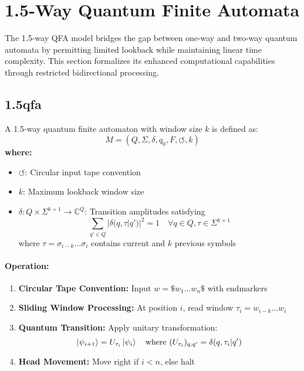 \section{1.5-Way Quantum Finite Automata}
\label{sec:1.5qfa}

The 1.5-way QFA model bridges the gap between one-way and two-way quantum automata by permitting limited lookback while maintaining linear time complexity. This section formalizes its enhanced computational capabilities through restricted bidirectional processing.

\subsection{\acrfull{1.5qfa}}
\label{subsec:1.5qfa}

\begin{definition}
A 1.5-way quantum finite automaton with window size $k$ is defined as:
\[
M = (Q, \Sigma, \delta, q_0, F, \circlearrowleft, k)
\]
\textbf{where:}
\begin{itemize}
    \item $\circlearrowleft$: Circular input tape convention
    \item $k$: Maximum lookback window size
    \item $\delta: Q \times \Sigma^{k+1} \rightarrow \mathbb{C}^Q$: Transition amplitudes satisfying
    \[
    \sum_{q'\in Q} |\delta(q,\tau|q')|^2 = 1 \quad \forall q \in Q, \tau \in \Sigma^{k+1}
    \]
    where $\tau = \sigma_{i-k}...\sigma_i$ contains current and $k$ previous symbols
\end{itemize}
\end{definition}

\paragraph{Operation:}
\begin{enumerate}
    \item \textbf{Circular Tape Convention:} Input $w = \$w_1...w_n\$$ with endmarkers
    \item \textbf{Sliding Window Processing:} At position $i$, read window $\tau_i = w_{i-k}...w_i$
    \item \textbf{Quantum Transition:} Apply unitary transformation:
    \[
    \ket{\psi_{i+1}} = U_{\tau_i} \ket{\psi_i} \quad \text{where } (U_{\tau_i})_{q,q'} = \delta(q,\tau_i|q')
    \]
    \item \textbf{Head Movement:} Move right if $i < n$, else halt
\end{enumerate}

